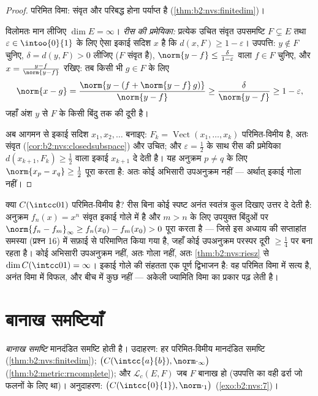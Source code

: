 \begin{proof}
परिमित विमा: संवृत और परिबद्ध होना पर्याप्त है (\cref{thm:b2:nvs:finitedim})।

विलोमतः मान लीजिए $\dim E = \infty$। \emph{रीस की प्रमेयिका:} प्रत्येक उचित संवृत
उपसमष्टि $F \subsetneq E$ तथा $\varepsilon \in
\intoo{0}{1}$ के लिए ऐसा इकाई सदिश $x$ है कि $d(x, F) \geq 1 -
\varepsilon$। उपपत्ति: $y \notin F$
चुनिए, $\delta = d(y, F) > 0$ लीजिए ($F$ संवृत है), $\norm{y - f} \leq
\frac{\delta}{1 - \varepsilon}$ वाला $f \in F$ चुनिए, और $x = \frac{y - f}{\norm{y -
f}}$ रखिए: तब
किसी भी $g \in F$ के लिए
\[
\norm{x - g} = \frac{\norm{y - (f + \norm{y-f}\,g)}}{\norm{y - f}}
\geq \frac{\delta}{\norm{y-f}} \geq 1 - \varepsilon ,
\]
जहाँ अंश $y$ से $F$ के किसी बिंदु तक की दूरी है।

अब आगमन से इकाई सदिश $x_1, x_2, \dots$ बनाइए: $F_k =
\operatorname{Vect}(x_1, \dots, x_k)$ परिमित-विमीय है, अतः संवृत (\cref{cor:b2:nvs:closedsubspace})
और उचित; और $\varepsilon = \frac12$ के साथ रीस की प्रमेयिका $d(x_{k+1},
F_k) \geq \frac12$ वाला इकाई $x_{k+1}$ दे देती है।
यह अनुक्रम $p \neq q$ के लिए $\norm{x_p - x_q} \geq
\frac12$ पूरा करता है: अतः कोई अभिसारी उपअनुक्रम नहीं
--- अर्थात् इकाई गोला  नहीं।
\end{proof}

\begin{example}[विमा-संसूचक के रूप में रीस]\label{ex:b2:nvs:rieszdetector}
क्या $C(\intcc01)$ परिमित-विमीय है? रीस बिना कोई स्पष्ट अनंत स्वतंत्र कुल दिखाए
उत्तर दे देती है: अनुक्रम $f_n(x) = x^n$ संवृत इकाई गोले में है और $m > n$ के लिए
उपयुक्त बिंदुओं पर $\norm{f_n - f_m}_\infty \geq f_n(x_0) - f_m(x_0) > 0$ पूरा करता है --- जिसे इस अध्याय की सप्ताहांत
समस्या (प्रश्न 16) में सफ़ाई से परिमाणित किया गया है, जहाँ कोई उपअनुक्रम
परस्पर दूरी $\geq \frac14$ पर बना रहता है। कोई अभिसारी उपअनुक्रम नहीं, अतः गोला
 नहीं, अतः \cref{thm:b2:nvs:riesz} से $\dim C(\intcc01) = \infty$। इकाई गोले की संहतता एक पूर्ण द्विभाजन है: वह
परिमित विमा में सत्य है, अनंत विमा में विफल, और बीच में कुछ नहीं ---
अकेली ज्यामिति विमा का प्रकार पढ़ लेती है।
\end{example}

\section{बानाख समष्टियाँ}

\begin{definition}\label{def:b2:nvs:banach}
\emph{बानाख समष्टि}  मानदंडित समष्टि होती है।
उदाहरण: हर परिमित-विमीय मानदंडित समष्टि (\cref{thm:b2:nvs:finitedim}); $\bigl(C(\intcc{a}{b}),
\norm\cdot_\infty\bigr)$ (\cref{thm:b2:metric:rncomplete}); और $\mathcal{L}_c(E, F)$ जब
$F$ बानाख हो (उपपत्ति का वही ढर्रा जो  फलनों के लिए था)।
अनुदाहरण: $\bigl(C(\intcc{0}{1}),
\norm\cdot_1\bigr)$ (\cref{exo:b2:nvs:7})।
\end{definition}

